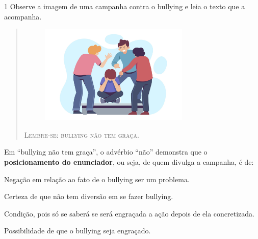 \num{1} Observe a imagem de uma campanha contra o bullying e leia o
texto que a acompanha.

\begin{quote}
\begin{figure}[H]
\centering\includegraphics[width=0.7\textwidth]{./imgSAEB_6_POR/freepik/PORT_6_IMG-27.jpeg}
\end{figure}

\centering\textsc{Lembre-se: bullying não tem graça.}
\end{quote}

\noindent Em ``bullying não tem graça'', o advérbio ``não'' demonstra que o
\textbf{posicionamento do enunciador}, ou seja, de quem divulga a
campanha, é de:

\begin{escolha}
\item Negação em relação ao fato de o bullying ser um problema.
\item Certeza de que não tem diversão em se fazer bullying.
\item Condição, pois só se saberá se será engraçada a ação depois de ela
concretizada.
\item Possibilidade de que o bullying seja engraçado.
\end{escolha}



